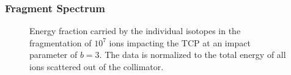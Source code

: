 \subsubsection{Fragment Spectrum}


\begin{figure}[htbp]
  \centering
  \caption{Energy fraction carried by the individual isotopes in the fragmentation of $10^7$ \lead ions impacting the TCP at an impact parameter of $b=3$\mum. The data is normalized to the total energy of all ions scattered out of the  collimator.}  
  \label{fig:stier_fragmentation}
  \end{figure}








